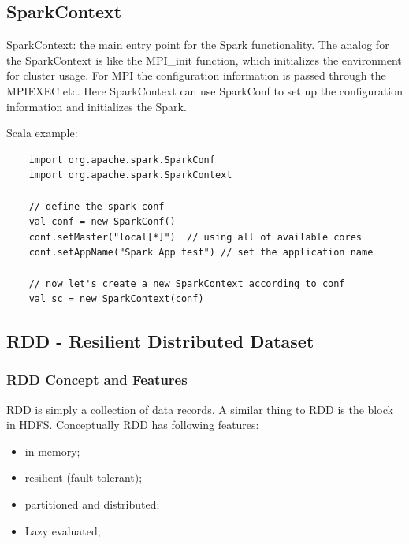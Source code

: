\documentclass[notheorems, aspectratio=54]{beamer}
\begin{document}
\subsection{SparkContext}
\begin{frame}[fragile]

   \begin{block}{SparkContext: the main entry point for the Spark functionality.}
   The analog for the SparkContext  is like the MPI\_init function, which initializes the environment for cluster usage. 
   For MPI the configuration information is passed through the MPIEXEC etc. Here SparkContext can use SparkConf
   to set up the configuration information and initializes the Spark.
   \end{block}
   
   Scala example:
   \begin{verbatim}
    import org.apache.spark.SparkConf
    import org.apache.spark.SparkContext

    // define the spark conf
    val conf = new SparkConf()
    conf.setMaster("local[*]")  // using all of available cores 
    conf.setAppName("Spark App test") // set the application name

    // now let's create a new SparkContext according to conf
    val sc = new SparkContext(conf)
   \end{verbatim}     
  
\end{frame}

\subsection{RDD - Resilient Distributed Dataset}
\subsubsection{RDD Concept and Features}
\begin{frame}

RDD is simply a collection of data records. A similar thing to RDD is the block in HDFS. Conceptually 
RDD has following features:
\begin{itemize}
 \item in memory;
 \item resilient (fault-tolerant);
 \item partitioned and distributed;
 \item Lazy evaluated;
\end{itemize} 
  
\end{frame}
\end{document}
